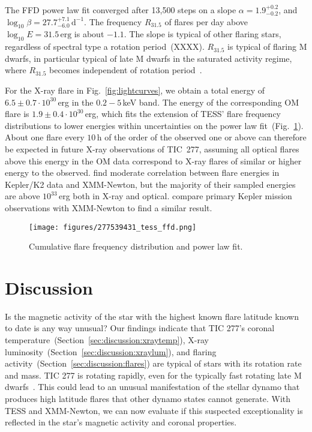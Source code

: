 \documentclass[twocolumn]{aastex631}
\begin{document}
The FFD power law fit converged after 13,500 steps on a slope $\alpha = 1.9_{-0.2}^{+0.2}$, and $\log_{10}\beta=27.7_{-6.0}^{+7.1}\,\mathrm{d}^{-1}$. The frequency $R_{31.5}$ of flares per day above $\log_{10} E = 31.5\,\mathrm{erg}$ is about $-1.1$. The slope is typical of other flaring stars, regardless of spectral type a rotation period~(XXXX). $R_{31.5}$ is typical of flaring M dwarfs, in particular typical of late M dwarfs in the saturated activity regime, where $R_{31.5}$ becomes independent of rotation period~\citep{medina2020flare,murray2022study}. 

For the X-ray flare in Fig.~\ref{fig:lightcurves}, we obtain a total energy of $6.5\pm0.7\cdot10^{30}\,$erg in the $0.2-5\,$keV band. The energy of the corresponding OM flare is $1.9\pm0.4\cdot 10^{30}\,$erg, which fits the extension of TESS' flare frequency distributions to lower energies within uncertainties on the power law fit~(Fig.~\ref{fig:ffd}). About one flare every $10\,$h of the order of the observed one or above can therefore be expected in future X-ray observations of TIC~277, assuming all optical flares above this energy in the OM data correspond to X-ray flares of similar or higher energy to the observed. \citet{guarcello2019simultaneous} find moderate correlation between flare energies in Kepler/K2 data and XMM-Newton, but the majority of their sampled energies are above $10^{33}\,$erg both in X-ray and optical. \citet{kuznetsov2021stellar} compare primary Kepler mission observations with XMM-Newton to find a similar result. 



\begin{figure}
    \begin{centering}
        \texttt{[image: figures/277539431\_tess\_ffd.png]}
        \caption{
         Cumulative flare frequency distribution and power law fit.
        }
        \label{fig:ffd}
    \end{centering}
\end{figure}

\section{Discussion}
\label{sec:discussion}

Is the magnetic activity of the star with the highest known flare latitude known to date is any way unusual? Our findings indicate that TIC 277's coronal temperature~(Section~\ref{sec:discussion:xraytemp}), X-ray luminosity~(Section~\ref{sec:discussion:xraylum}), and flaring activity~(Section~\ref{sec:discussion:flares}) are typical of stars with its rotation rate and mass. TIC 277 is rotating rapidly, even for the typically fast rotating late M dwarfs~\citep{medina2022galactic}. This could lead to an unusual manifestation of the stellar dynamo that produces high latitude flares that other dynamo states cannot generate. With TESS and XMM-Newton, we can now evaluate if this suspected exceptionality is reflected in the star's magnetic activity and coronal properties. 
\end{document}
